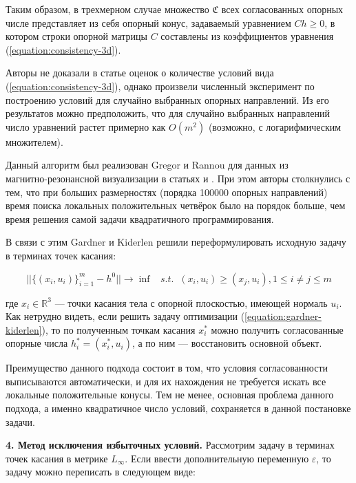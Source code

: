 \documentclass[a4paper, 10pt]{article}
\theoremstyle{definition}
\theoremstyle{plain}
\theoremstyle{plain}
\begin{document}
Таким образом, в трехмерном случае множество $\mathfrak{C}$ всех согласованных
опорных числе представляет из себя опорный конус, задаваемый уравнением
$C h \geq 0$, в котором строки опорной матрицы $C$ составлены из коэффициентов
уравнения (\ref{equation:consistency-3d}).

Авторы не доказали в статье оценок о количестве условий вида
(\ref{equation:consistency-3d}), однако произвели численный эксперимент по
построению условий для случайно выбранных опорных направлений. Из его
результатов можно предположить, что для случайно выбранных направлений число
уравнений растет примерно как $O(m^{2})$ (возможно, с логарифмическим
множителем).

Данный алгоритм был реализован Gregor и Rannou для данных из \\
магнитно-резонансной визуализации в статьях \cite{IMA:IMA10007} и
\cite{doi:10.1117/12.431168}. При этом авторы столкнулись с тем, что при больших
размерностях (порядка 100000 опорных направлений) время поиска локальных
положительных четвёрок было на порядок больше, чем время решения самой задачи
квадратичного программирования.

В связи с этим Gardner и Kiderlen \cite{4586384} решили переформулировать
исходную задачу в терминах точек касания:

\begin{equation}
\label{equation:gardner-kiderlen}
 ||\{(x_{i}, u_{i})\}_{i = 1}^{m} - h^{0}|| \to \inf \;\;\; s. t. \;\;
 (x_{i}, u_{i}) \geq (x_{j}, u_{i}), 1 \leq i \neq j \leq m
\end{equation}

где $x_{i} \in \mathbb{R}^{3}$ --- точки касания тела с опорной плоскостью,
имеющей нормаль $u_{i}$. Как нетрудно видеть, если решить задачу оптимизации
(\ref{equation:gardner-kiderlen}), то по полученным точкам касания $x^{*}_{i}$
можно получить согласованные опорные числа $h^{*}_{i} = (x^{*}_{i}, u_{i})$, а
по ним --- восстановить основной объект.

Преимущество данного подхода состоит в том, что условия согласованности
выписываются автоматически, и для их нахождения не требуется искать все
локальные положительные конусы. Тем не менее, основная проблема данного подхода,
а именно квадратичное число условий, сохраняется в данной постановке задачи.

\textbf{4. Метод исключения избыточных условий.} Рассмотрим задачу в терминах
точек касания в метрике $L_{\infty}$. Если ввести дополнительную переменную
$\varepsilon$, то задачу можно переписать в следующем виде:
\end{document}
